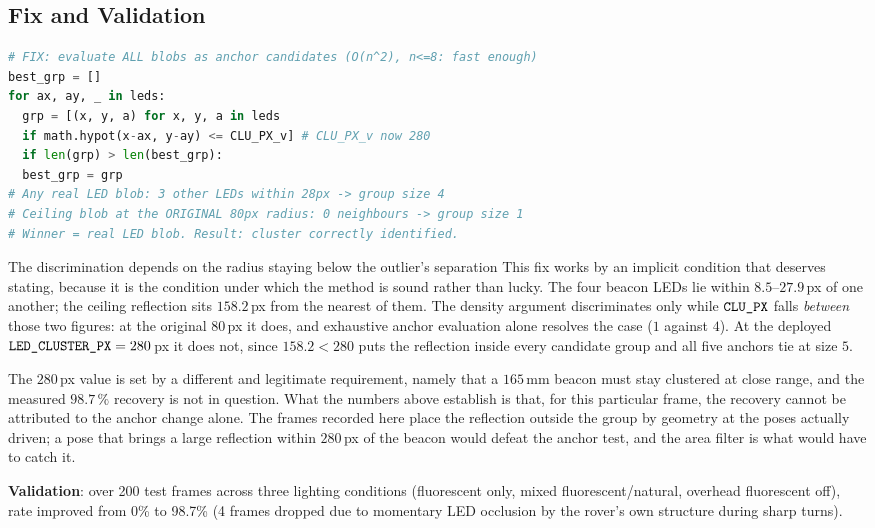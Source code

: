 \subsection{Fix and Validation}

\begin{lstlisting}[language=Python, caption={Fix: exhaustive anchor evaluation with corrected cluster radius}, label={lst:cs1-fix}]
# FIX: evaluate ALL blobs as anchor candidates (O(n^2), n<=8: fast enough)
best_grp = []
for ax, ay, _ in leds:
  grp = [(x, y, a) for x, y, a in leds
  if math.hypot(x-ax, y-ay) <= CLU_PX_v] # CLU_PX_v now 280
  if len(grp) > len(best_grp):
  best_grp = grp
# Any real LED blob: 3 other LEDs within 28px -> group size 4
# Ceiling blob at the ORIGINAL 80px radius: 0 neighbours -> group size 1
# Winner = real LED blob. Result: cluster correctly identified.
\end{lstlisting}

\begin{trapbox}{The discrimination depends on the radius staying below the
outlier's separation}
This fix works by an implicit condition that deserves stating, because it is
the condition under which the method is sound rather than lucky. The four
beacon LEDs lie within $8.5$--$27.9$\,px of one another; the ceiling
reflection sits $158.2$\,px from the nearest of them. The density argument
discriminates only while $\code{CLU\_PX}$ falls \emph{between} those two
figures: at the original $80$\,px it does, and exhaustive anchor evaluation
alone resolves the case ($1$ against $4$). At the deployed
$\code{LED\_CLUSTER\_PX}=280$\,px it does not, since $158.2 < 280$ puts the
reflection inside every candidate group and all five anchors tie at size $5$.

The $280$\,px value is set by a different and legitimate requirement, namely
that a $165$\,mm beacon must stay clustered at close range, and the measured
$98.7\,\%$ recovery is not in question. What the numbers above establish is
that, for this particular frame, the recovery cannot be attributed to the
anchor change alone. The frames recorded here place the reflection outside
the group by geometry at the poses actually driven; a pose that brings a
large reflection within $280$\,px of the beacon would defeat the anchor
test, and the area filter is what would have to catch it.
\end{trapbox}

\textbf{Validation}: over 200 test frames across three lighting conditions (fluorescent only, mixed fluorescent/natural, overhead fluorescent off),  rate improved from 0\% to 98.7\% (4 frames dropped due to momentary LED occlusion by the rover's own structure during sharp turns).

